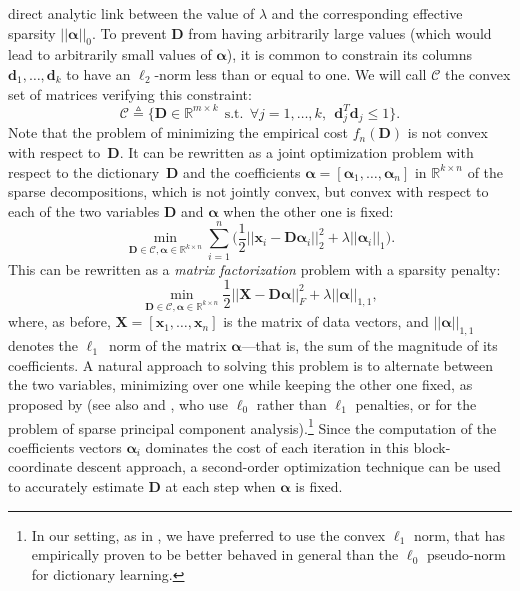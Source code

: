 \documentclass[twoside,11pt]{article}
\def\x{{\mathbf x}}
\def\X{{\mathbf X}}
\def\alphab{{\boldsymbol\alpha}}
\def\D{{\mathbf D}}
\def\d{{\mathbf d}}
\def\C{{\mathcal C}}
\def\d{{\mathbf d}}
\def\Real{{\mathbb R}}
\def\st{~~\text{s.t.}~~}
\def\defin{\stackrel{\vartriangle}{=}}
\begin{document}
direct analytic link between the value of $\lambda$ and the corresponding
effective sparsity $||\alphab||_0$. To prevent $\D$ from having
arbitrarily large values (which would lead to arbitrarily small
values of $\alphab$), it is common to constrain its columns
$\d_1,\ldots,\d_k$ to have an $\ell_2$-norm less than or equal to one.
We will call $\C$ the convex set of matrices verifying this
constraint:
\begin{displaymath}
   \C \defin \{ \D \in \Real^{m \times k} \st \forall j=1,\ldots,k,~~ \d_j^T\d_j \leq 1 \}.
\end{displaymath}
Note that the problem of minimizing the empirical cost $f_n(\D)$ is
not convex with respect to~$\D$. It can be rewritten as a joint
optimization problem with respect to the dictionary~$\D$ and the
coefficients $\alphab = [\alphab_1,\ldots,\alphab_n]$ in $\Real^{k \times n}$ of the sparse
decompositions, which is not jointly convex, but convex with respect to
each of the two variables $\D$ and $\alphab$ when the other one is
fixed:
\begin{equation}
   \min_{\D \in \C,\alphab \in \Real^{k \times n}} \sum_{i=1}^n
   \Big(\frac{1}{2}||\x_i-\D\alphab_i||_2^2 + \lambda ||\alphab_i||_1\Big).
   \label{eq:joint} 
\end{equation}
This can be rewritten as a \emph{matrix factorization} problem with a sparsity penalty:
\begin{displaymath}
   \min_{\D \in \C,\alphab \in \Real^{k \times n}}
   \frac{1}{2}||\X-\D\alphab||_F^2 + \lambda ||\alphab||_{1,1},
\end{displaymath}
where, as before, $\X = [\x_1,\ldots,\x_n]$ is the matrix of data vectors,
and $||\alphab||_{1,1}$ denotes the $\ell_1$~norm of the matrix $\alphab$---that is, the sum of the magnitude of its coefficients.
A natural approach to solving this problem is to alternate between the
two variables, minimizing over one while keeping the other one fixed,
as proposed by \citet{lee} (see also \citealt{engan} and
\citealt{aharon}, who use $\ell_0$ rather than $\ell_1$
penalties, or \citealt{zou2} for the problem of sparse principal component analysis).\footnote{In our setting, as in \citet{lee}, we have
preferred to use the convex $\ell_1$ norm, that has empirically proven
to be better behaved in general than the $\ell_0$ pseudo-norm for
dictionary learning.} Since 
the computation of the coefficients vectors $\alphab_i$ 
dominates the cost of each iteration in this block-coordinate descent approach, a second-order optimization technique can be
used to accurately estimate $\D$ at each step when $\alphab$ is fixed.
\end{document}
